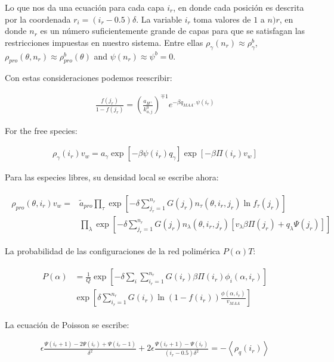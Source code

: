Lo que nos da una ecuaci\'on para cada capa $i_r$, en donde cada posici\'on es descrita por la coordenada $r_i = (i_r -0.5)\delta$. 
La variable $i_r$ toma valores de $1$ a $n)r$, en donde $n_r$ es un n\'umero suficientemente grande de capas para que se satisfagan las restricciones impuestas en nuestro sistema. Entre ellas
 $\rho_\gamma(n_r) \approx \rho_\gamma^b$, $\rho_{pro}(\theta,n_r) \approx \rho_{pro}^b(\theta)$ and $\psi(n_r) \approx \psi^b = 0$.

Con estas consideraciones podemos reescribir:


\begin{align}
	\frac{f(j_r)}{1-f(j_r)}= \left(\frac{a_{H^+}}{k^0_{a,j}}\right)^{\mp 1} e^{-\beta q_{MAA^-}\psi(i_r)}
\end{align}


For the free species:

\begin{align}
	\rho_\gamma(i_r)v_w = a_\gamma \exp{[-\beta \psi(i_r)q_\gamma]} \exp{[-\beta\Pi(i_r) v_w]}
\end{align}

Para las especies libres, su densidad local se escribe ahora:

\begin{align}
	\begin{aligned}
		\rho_{pro}(\theta, i_r)v_w = &\tilde{a}_{pro} \prod_\tau\exp\left[- \delta \sum^{n_r}_{j_r = 1} G(j_r) n_\tau(\theta,i_r,j_r) \ln f_\tau(j_r)\right] \\
		& \prod_\lambda \exp \left[- \delta \sum^{n_r}_{j_r = 1} G(j_r) n_\lambda(\theta,i_r, j_r)[v_\lambda\beta\Pi(j_r) + q_\lambda \Psi(j_r)] \right]
	\end{aligned}
\end{align}

La probabilidad de las configuraciones de la red polim\'erica $P(\alpha)T$: 

\begin{align}
	\begin{aligned}
		P(\alpha)&=\frac{1}{Q}\exp\left[- \delta\sum_i{\sum_{i_r =1}^{n_r}{G(i_r)\beta\Pi(i_r)\phi_i(\alpha,i_r)}}\right] \\
		& \exp\left[\delta\sum_{i_r =1}^{n_r}{G(i_r)\ln(1-f(i_r))\frac{\phi(\alpha,i_r)}{v_{MAA}}}\right]
	\end{aligned}
\end{align}

La ecuaci\'on de Poisson se escribe:

\begin{align}
	\epsilon \frac{\Psi(i_r +1) -2 \Psi(i_r) + \Psi(i_r -1)}{\delta ^2} + 2\epsilon \frac{\Psi(i_r +1) -\Psi(i_r)}{(i_r -0.5)\delta ^2}= -\left<\rho_q(i_r)\right>
	\label{eq:esf:poisson-ir}
\end{align}

